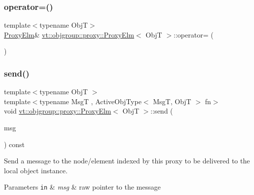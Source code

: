 \subsubsection{\texorpdfstring{operator=()}{operator=()}}
{\footnotesize\ttfamily template$<$typename ObjT$>$ \\
\hyperlink{structvt_1_1objgroup_1_1proxy_1_1_proxy_elm}{Proxy\+Elm}\& \hyperlink{structvt_1_1objgroup_1_1proxy_1_1_proxy_elm}{vt\+::objgroup\+::proxy\+::\+Proxy\+Elm}$<$ ObjT $>$\+::operator= (\begin{DoxyParamCaption}\item[{\hyperlink{structvt_1_1objgroup_1_1proxy_1_1_proxy_elm}{Proxy\+Elm}$<$ ObjT $>$ const \&}]{ }\end{DoxyParamCaption})\hspace{0.3cm}{\ttfamily [default]}}

\mbox{\label{structvt_1_1objgroup_1_1proxy_1_1_proxy_elm_a64d85f6d2721f2001e1e9ecb910e34f9}} 
\subsubsection{\texorpdfstring{send()}{send()}\hspace{0.1cm}{\footnotesize\ttfamily [1/4]}}
{\footnotesize\ttfamily template$<$typename ObjT $>$ \\
template$<$typename MsgT , Active\+Obj\+Type$<$ Msg\+T, Obj\+T $>$ fn$>$ \\
void \hyperlink{structvt_1_1objgroup_1_1proxy_1_1_proxy_elm}{vt\+::objgroup\+::proxy\+::\+Proxy\+Elm}$<$ ObjT $>$\+::send (\begin{DoxyParamCaption}\item[{MsgT $\ast$}]{msg }\end{DoxyParamCaption}) const}



Send a message to the node/element indexed by this proxy to be delivered to the local object instance. 


\begin{DoxyParams}[1]{Parameters}
\mbox{\tt in}  & {\em msg} & raw pointer to the message \\
\hline
\end{DoxyParams}
\mbox{\label{structvt_1_1objgroup_1_1proxy_1_1_proxy_elm_ab3d1751dac7c003cd13306277c164247}} 
